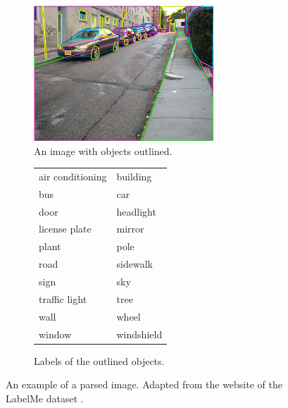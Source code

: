 \begin{figure}[p]
\begin{subfigure}[b]{0.45\textwidth}
\centering
\includegraphics[height=2in]{images/labelmeparse.png}
\caption{An image with objects outlined.}
\end{subfigure}
\begin{subfigure}[b]{0.45\textwidth}
\begin{tabular}{l l}
air conditioning & building\\
bus & car\\
door & headlight\\
license plate & mirror\\
plant & pole\\
road & sidewalk\\
sign & sky\\
traffic light & tree\\
wall & wheel\\
window & windshield\\
\end{tabular}
\caption{Labels of the outlined objects.}
\end{subfigure}
\caption{An example of a parsed image. Adapted from the website of the
  LabelMe dataset \cite{labelme}.}
\label{fig-labelme}
\end{figure}



